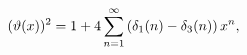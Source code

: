 \[(\mathop{\vartheta\/}\nolimits\!\left(x\right))^{2}=1+4\sum_{n=1}^{\infty}%
\left(\delta_{1}(n)-\delta_{3}(n)\right)x^{n},\]